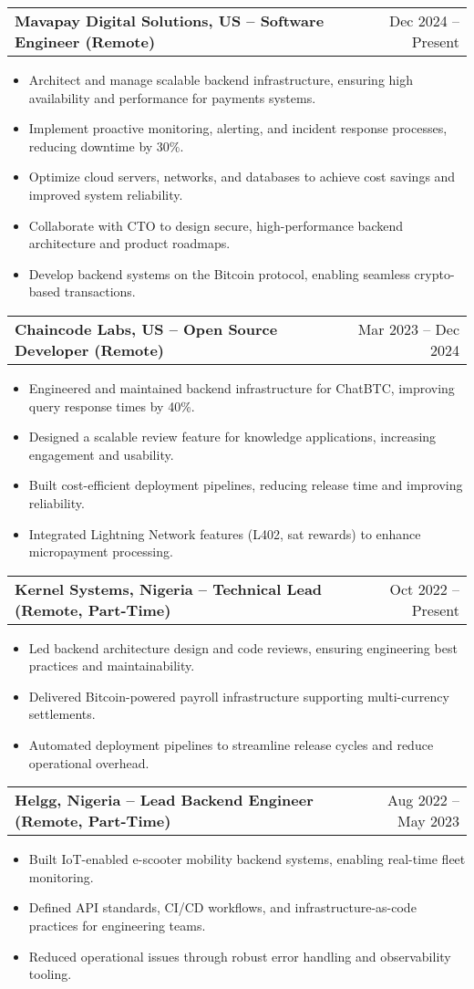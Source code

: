 \documentclass[a4paper,12pt]{article}
\makeatletter
\newenvironment{joblong}[2]
    {
    \begin{tabularx}{\linewidth}{@{}l X r@{}}
    \textbf{#1} & \hfill &  #2 \\[3.75pt]
    \end{tabularx}
    \begin{minipage}[t]{\linewidth}
    \begin{itemize}[nosep,after=\strut, leftmargin=1em, itemsep=3pt,label=--]
    }
    {
    \end{itemize}
    \end{minipage}    
    }
\makeatother
\begin{document}
\begin{joblong}{Mavapay Digital Solutions, US -- Software Engineer (Remote)}{Dec 2024 -- Present}
\item Architect and manage scalable backend infrastructure, ensuring high availability and performance for payments systems.
\item Implement proactive monitoring, alerting, and incident response processes, reducing downtime by 30\%.
\item Optimize cloud servers, networks, and databases to achieve cost savings and improved system reliability.
\item Collaborate with CTO to design secure, high-performance backend architecture and product roadmaps.
\item Develop backend systems on the Bitcoin protocol, enabling seamless crypto-based transactions.
\end{joblong}

\begin{joblong}{Chaincode Labs, US -- Open Source Developer (Remote)}{Mar 2023 -- Dec 2024}
\item Engineered and maintained backend infrastructure for ChatBTC, improving query response times by 40\%.
\item Designed a scalable review feature for knowledge applications, increasing engagement and usability.
\item Built cost-efficient deployment pipelines, reducing release time and improving reliability.
\item Integrated Lightning Network features (L402, sat rewards) to enhance micropayment processing.
\end{joblong}

\begin{joblong}{Kernel Systems, Nigeria -- Technical Lead (Remote, Part-Time)}{Oct 2022 -- Present}
\item Led backend architecture design and code reviews, ensuring engineering best practices and maintainability.
\item Delivered Bitcoin-powered payroll infrastructure supporting multi-currency settlements.
\item Automated deployment pipelines to streamline release cycles and reduce operational overhead.
\end{joblong}

\begin{joblong}{Helgg, Nigeria -- Lead Backend Engineer (Remote, Part-Time)}{Aug 2022 -- May 2023}
\item Built IoT-enabled e-scooter mobility backend systems, enabling real-time fleet monitoring.
\item Defined API standards, CI/CD workflows, and infrastructure-as-code practices for engineering teams.
\item Reduced operational issues through robust error handling and observability tooling.
\end{joblong}
\end{document}
